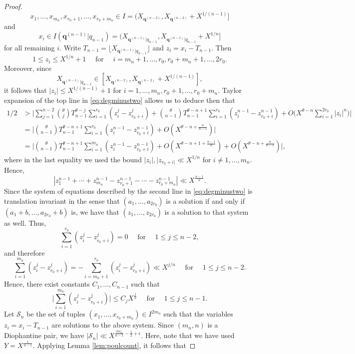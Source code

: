 \documentclass[11pt,reqno]{amsart}
\numberwithin{equation}{section}
\begin{document}
\begin{proof}
\[ x_1,\ldots,x_{m_n},x_{r_0+1},\ldots,x_{r_0+m_n} \in I = (X_{\mathbf{q}^{(n-2)}}, X_{\mathbf{q}^{(n-2)}}+X^{1/(n-1)}]\] 
and 
\[x_i \in I({\mathbf{q}^{(n-1)}|q_{n-1}}) = (X_{\mathbf{q}^{(n-1)}|q_{n-1}}, X_{\mathbf{q}^{(n-1)}|q_{n-1}}+X^{1/n}] \] 
for all remaining $i$. Write $T_{n-1} = \lfloor X_{\mathbf{q}^{(n-1)}|q_{n-1}} \rfloor $ and $z_i = x_i-T_{n-1}$. Then 
\[ 1 \leq z_i \leq X^{1/n}+1 \quad \text{ for } \quad i = m_n+1,\ldots,r_0,r_0+m_n+1,\ldots,2r_0. \] Moreover, since 
\[ X_{\mathbf{q}^{(n-1)}|q_{n-1}} \in [X_{\mathbf{q}^{(n-2)}},X_{\mathbf{q}^{(n-2)}}+X^{1/(n-1)}],\] 
it follows that $|z_i| \leq X^{1/(n-1)}+1$ for $i = 1,\ldots,m_n,r_0+1,\ldots,r_0+m_n$. Taylor expansion of the top line in \eqref{eq:degminustwo} allows us to deduce then that 
\begin{align*} 
1/2 & > \Big|\sum_{j=1}^{n-2} \binom{\theta}{j} T_{n-1}^{\theta-j} \sum_{i=1}^{r_0} (z_i^j-z_{r_0+i}^j) + \binom{\theta}{n-1}T_{n-1}^{\theta-n+1} \sum_{i=1}^{r_0} (z_i^{n-1} -z_{r_0+i}^{n-1}) + O\Big(X^{\theta-n}\sum_{i=1}^{2r_0} |z_i|^n\Big) \Big| 
\\ 
& = \Big| \binom{\theta}{n-1}T_{n-1}^{\theta-n+1} \sum_{i=1}^{r_0} (z_i^{n-1} -z_{r_0+i}^{n-1}) + O(X^{\theta-n+\frac{n}{n-1}}) \Big|
\\ 
& = \Big| \binom{\theta}{n-1}T_{n-1}^{\theta-n+1} \sum_{i=1}^{m_n} (z_i^{n-1} -z_{r_0+i}^{n-1}) +O(X^{\theta-n+1+\frac{n-1}{n}}) + O(X^{\theta-n+\frac{n}{n-1}}) \Big|,
\end{align*}
where in the last equality we used the bound $|z_i|, |z_{r_0+i|} \ll X^{1/n}$ for $i \neq 1,\ldots,m_n$. Hence, 
\[ |z_1^{n-1}+\cdots+z_{m_n}^{n-1}-z_{r_0+1}^{n-1}-\cdots-z_{r_0+m_n}^{n-1}| \ll X^{\frac{n-1}{n}}. \] 
Since the system of equations described by the second line in \eqref{eq:degminustwo} is translation invariant in the sense that $(a_1,\ldots,a_{2r_0})$ is a solution if and only if $(a_1+b,\ldots, a_{2r_0}+b)$ is, we have that $(z_1,\ldots,z_{2r_0})$ is a solution to that system as well. Thus, 
\[ \sum_{i=1}^{r_0} (z_i^j-z_{r_0+i}^j) = 0 \quad \text{ for } \quad 1 \leq j \leq n-2, \]
and therefore 
\[ \sum_{i=1}^{m_n} (z_i^j-z_{r_0+i}^j) = -\sum_{i=m_n+1}^{r_0} (z_i^j-z_{r_0+i}^j) \ll X^{j/n} \quad \text{ for } \quad 1 \leq j \leq n-2. \]
Hence, there exist constants $C_1,\ldots, C_{n-1}$ such that 
\[ \Big| \sum_{i=1}^{m_n} (z_i^j - z_{r_0+i}^j ) \Big| \leq C_j X^{\frac{j}{n}} \quad \text{ for } \quad 1 \leq j \leq n-1. \]
Let $\mathcal{S}_{n}$ be the set of tuples $(x_1,\ldots,x_{r_0+m_n}) \in I^{2m_n}$ such that the variables $z_i=x_i-T_{n-1}$ are solutions to the above system. Since $(m_n,n)$ is a Diophantine pair, we have $|\mathcal{S}_{n}| \ll X^{\frac{2m_n}{n-1}-\frac{1}{2}+\epsilon}$. Here, note that we have used $Y = X^{\frac{1}{n-1}}$. Applying Lemma \ref{lem:poulcount}, it follows that 

\end{proof}
\end{document}
